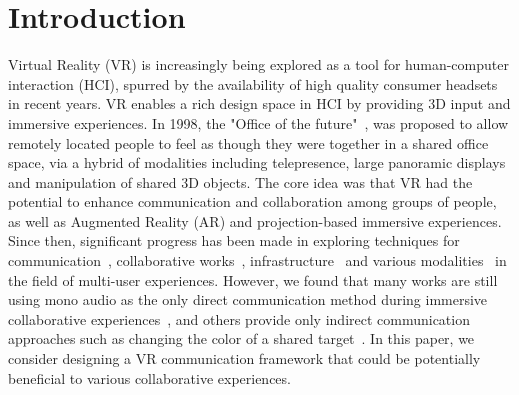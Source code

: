 \documentclass{sigchi}
\begin{document}
\section{Introduction}
Virtual Reality (VR) is increasingly being explored as a tool for human-computer interaction (HCI), spurred by the availability of high quality consumer headsets in recent years. VR enables a rich design space in HCI by providing 3D input and immersive experiences. In 1998, the "Office of the future"~\cite{raskar1998office}, was proposed to allow remotely located people to feel as though they were together in a shared office space, via a hybrid of modalities including telepresence, large panoramic displays and manipulation of shared 3D objects. The core idea was that VR had the potential to enhance communication and collaboration among groups of people, as well as Augmented Reality (AR) and projection-based immersive experiences. Since then, significant progress has been made in exploring techniques for communication~\cite{ishii1993integration, otsuka2016mmspace}, collaborative works~\cite{kunert2014photoportals,tang2010three}, infrastructure~\cite{maimone2013general, o2011blended, thomas2014muvr} and various modalities~\cite{follmer2013inform, leithinger2014physical, leithinger2015shape, nakagaki2019inforce} in the field of multi-user experiences. However, we found that many works are still using mono audio as the only direct communication method during immersive collaborative experiences~\cite{xia2018spacetime}, and others provide only indirect communication approaches such as changing the color of a shared target~\cite{huo2018synchronizar}. In this paper, we consider designing a VR communication framework that could be potentially beneficial to various collaborative experiences.
\end{document}
